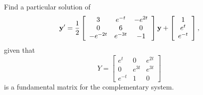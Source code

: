 \setcounter{example}{4}
\setcounter{equation}{9}
\begin{example}
  \label{example:10.7.5} \rm Find a particular solution of
  \begin{equation}
    \label{eq:10.7.10}{\bf y}'=\frac{1}{2}\left[
    \begin{array}{ccc}
      3        & e^{-t}  & -e^{2t} \\
      0        & 6       & 0       \\
      -e^{-2t} & e^{-3t} & -1
    \end{array}\right]{\bf y}+\left[
    \begin{array}{c}
      1      \\
      e^{t}  \\
      e^{-t}
    \end{array}\right],
  \end{equation}
  given that
  \[
    Y=\left[
    \begin{array}{ccc}
      e^{t}  & 0      & e^{2t} \\
      0      & e^{3t} & e^{3t} \\
      e^{-t} & 1      & 0
    \end{array}\right]
  \]
  is a fundamental matrix for the complementary system.
\end{example}
